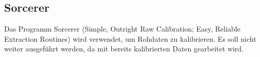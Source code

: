 \subsection{Sorcerer}%
\label{sub:sorcerer}

Das Programm Sorcerer (Simple, Outright Raw Calibration; Easy, Reliable
Extraction Routines) wird verwendet, um Rohdaten zu kalibrieren.
Es soll nicht weiter ausgeführt werden, da mit bereits kalibrierten Daten
gearbeitet wird.

